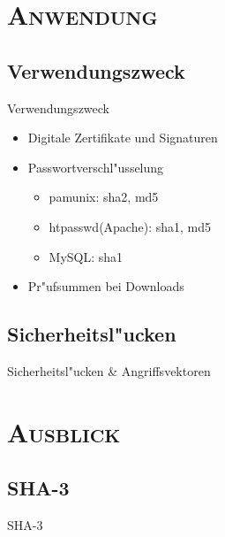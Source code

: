\documentclass[xcolor=x11names,compress]{beamer}
\renewcommand{\(}{\begin{columns}}
\renewcommand{\)}{\end{columns}}
\newcommand{\<}[1]{\begin{column}{#1}}
\renewcommand{\>}{\end{column}}
\begin{document}
\section{\scshape Anwendung}
\subsection{Verwendungszweck}
\begin{frame}{Verwendungszweck}

\begin{itemize}
\item Digitale Zertifikate und Signaturen 
	\pause
\item Passwortverschl"usselung
\begin{itemize}
	\item pam\textunderscore unix: sha2, md5
	\item htpasswd(Apache): sha1, md5
	\item MySQL: sha1
\end{itemize}
\pause
\item Pr"ufsummen bei Downloads
\end{itemize}


\end{frame}
\subsection{Sicherheitsl"ucken}
\begin{frame}{Sicherheitsl"ucken \& Angriffsvektoren}

\end{frame}

\section{\scshape Ausblick}
\subsection{SHA-3}
\begin{frame}{SHA-3}

\end{frame}
\end{document}
